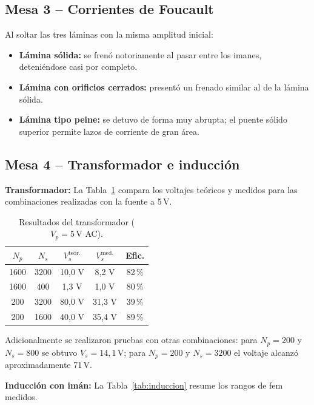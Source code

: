 \documentclass[11pt,twocolumn]{article}
\begin{document}
\subsection*{Mesa 3 -- Corrientes de Foucault}

Al soltar las tres l\'aminas con la misma amplitud inicial:
\begin{itemize}
  \item \textbf{L\'amina s\'olida:} se fren\'o notoriamente al pasar entre los imanes, deteni\'endose casi por completo.
  \item \textbf{L\'amina con orificios cerrados:} present\'o un frenado similar al de la l\'amina s\'olida.
  \item \textbf{L\'amina tipo peine:} se detuvo de forma muy abrupta; el puente s\'olido superior permite lazos de corriente de gran \'area.
\end{itemize}

\subsection*{Mesa 4 -- Transformador e inducci\'on}

\textbf{Transformador:} La Tabla~\ref{tab:transformador} compara los voltajes te\'oricos y medidos para las combinaciones realizadas con la fuente a 5\,V.

\begin{table}[H]
  \centering
  \caption{Resultados del transformador ($V_p = 5\,\text{V}$ AC).}
  \label{tab:transformador}
  \begin{tabular}{ccccc}
    \toprule
    $N_p$ & $N_s$ & $V_s^{\text{te\'or.}}$ & $V_s^{\text{med.}}$ & Efic. \\
    \midrule
    1600 & 3200 & 10,0 V & 8,2 V  & 82\,\% \\
    1600 &  400 &  1,3 V & 1,0 V  & 80\,\% \\
     200 & 3200 & 80,0 V & 31,3 V & 39\,\% \\
     200 & 1600 & 40,0 V & 35,4 V & 89\,\% \\
    \bottomrule
  \end{tabular}
\end{table}

Adicionalmente se realizaron pruebas con otras combinaciones: para $N_p=200$ y $N_s=800$ se obtuvo $V_s=14{,}1\,\text{V}$; para $N_p=200$ y $N_s=3200$ el voltaje alcanz\'o aproximadamente 71\,V.

\textbf{Inducci\'on con im\'an:} La Tabla~\ref{tab:induccion} resume los rangos de fem medidos.
\end{document}
